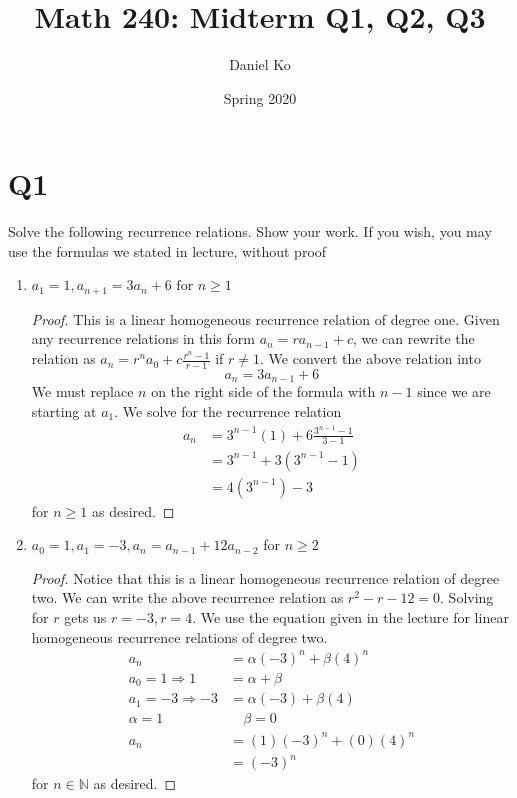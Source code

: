 \documentclass[11pt]{scrartcl}
\title{Math 240: Midterm Q1, Q2, Q3}
\author{Daniel Ko}
\date{Spring 2020}
\begin{document}
\maketitle

\section{Q1}
Solve the following recurrence relations. Show your work. If you wish,
you may use the formulas we stated in lecture, without proof
\begin{enumerate}[label=\alph*.]
	\item{
		$ a_{1}=1, a_{n+1}=3 a_{n}+6 \text { for } n \geq 1$
		\begin{proof}
			This is a linear homogeneous recurrence relation of degree one.
			Given any recurrence relations in this form $a_n = ra_{n-1} + c$, we can rewrite the relation as
			$a_{n}=r^{n} a_{0}+c \frac{r^{n}-1}{r-1}$ if $r \neq 1$. We convert the above relation into 			
			\[
				a_{n}=3 a_{n-1}+6	
			\]
			We must replace $n$ on the right side of the formula with $n-1$ since we are starting
			at $a_1$.
			We solve for the recurrence relation
			\begin{align*}
				a_{n} & = 3^{n-1}(1) + 6 \frac{3^{n-1}-1}{3-1} \\
				& = 3^{n-1} + 3(3^{n-1}-1)\\
				& = 4(3^{n-1}) - 3
			\end{align*}
			for $n \geq 1$ as desired.
		\end{proof}
	}
	\item{
		$a_{0}=1, a_{1}=-3, a_{n}=a_{n-1}+12 a_{n-2}$ for $n \geq 2$
		\begin{proof}
			Notice that this is a linear homogeneous recurrence relation of degree two.
			We can write the above recurrence relation as $r^2 - r - 12 = 0$. Solving for $r$ gets us $r = -3, r = 4$.
			We use the equation given in the lecture for linear homogeneous recurrence relations of degree two.
			\begin{align*}
			a_n & = \alpha(-3)^n + \beta(4)^n\\
			a_{0}=1 \Rightarrow 1 & = \alpha + \beta \\
			a_{1}=-3 \Rightarrow -3 & = \alpha (-3) + \beta (4)\\
			\alpha = 1 \quad & \quad \beta = 0\\ 
			a_n & =  (1) (-3)^n + (0)(4)^n \\
			& = (-3)^n
			\end{align*}
			for $n \in \mathbb{N}$ as desired.
		\end{proof}
	}
\end{enumerate}
\end{document}
